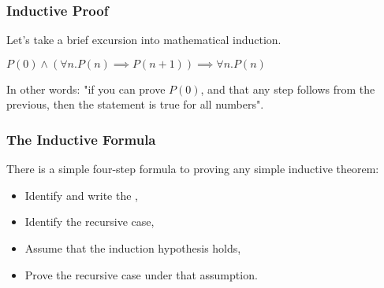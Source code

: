 \documentclass[aspectratio=169]{beamer}
\begin{document}

\begin{frame}[fragile]
  \frametitle{Inductive Proof}

  Let's take a brief excursion into mathematical induction.

  \pause
  \vspace{\fill}


  \pause
  \vspace{5pt}

  \begin{center}
     $P(0) \land (\forall n. P(n) \implies P(n + 1)) \implies \forall n. P(n)$
  \end{center}

  \pause
  \vspace{\fill}

  In other words: "if you can prove $P(0)$, and that any step follows from the 
  previous, then the statement is true for all numbers".
\end{frame}

\begin{frame}[fragile]
  \frametitle{The Inductive Formula}

  There is a simple four-step formula to proving any simple inductive theorem: 

  \pause
  \vspace{5pt}

  \begin{itemize}
    \item Identify and write the , \pause
    \item Identify the recursive case, \pause
    \item Assume that the induction hypothesis holds, \pause 
    \item Prove the recursive case under that assumption. \pause 
  \end{itemize}

  \pause
  \vspace{\fill}

\end{frame}
\end{document}

